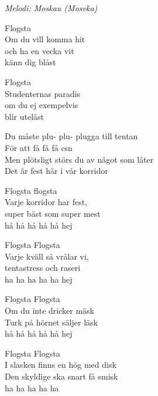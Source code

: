 {\footnotesize\textit{Melodi: Moskau (Mosvka)}}\par
\vspace{8pt}
{Flogsta\\
Om du vill komma hit\\
och ha en vecka vit\\
känn dig blåst\par
\vspace{6pt}
Flogsta\\
Studenternas paradis\\
om du ej exempelvis\\
blir utelåst\par
\vspace{6pt}
Du måste plu- plu- plugga till tentan\\
För att få få få csn\\
Men plötsligt störs du av något som låter\\
Det är fest här i vår korridor\par
\vspace{6pt}
Flogsta flogsta\\
Varje korridor har fest,\\
super bäst som super mest\\
hå hå hå hå hå hej\par
\vspace{6pt}
Flogsta Flogsta\\
Varje kväll så vrålar vi,\\
tentastress och raseri\\
ha ha ha ha ha hej\par
\vspace{6pt}
Flogsta Flogsta\\
Om du inte dricker mäsk\\
Turk på hörnet säljer läsk\\
hå hå hå hå hå hej\par
\vspace{6pt}
Flogsta Flogsta\\
I slasken finns en hög med disk\\
Den skyldige ska snart få smisk\\
ha ha ha ha ha}\par
\newpage
